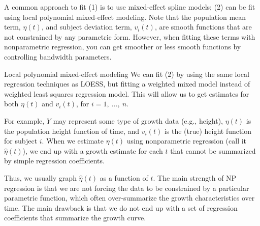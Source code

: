 \documentclass[
  9pt,
  ignorenonframetext,
]{beamer}
\begin{document}
\begin{frame}{}
\protect\hypertarget{section-6}{}
A common approach to fit (1) is to use mixed-effect spline models; (2)
can be fit using local polynomial mixed-effect modeling. Note that the
population mean term, \(\eta (t)\), and subject deviation term,
\(v_i(t)\), are smooth functions that are not constrained by any
parametric form. However, when fitting these terms with nonparametric
regression, you can get smoother or less smooth functions by controlling
bandwidth parameters.
\end{frame}

\begin{frame}{Local polynomial mixed-effect modeling}
\protect\hypertarget{local-polynomial-mixed-effect-modeling}{}
We can fit (2) by using the same local regression techniques as LOESS,
but fitting a weighted mixed model instead of weighted least squares
regression model. This will allow us to get estimates for both
\(\eta (t)\) and \(v_i(t)\), for \(i=1,\ ...,\ n\).

For example, \(Y\) may represent some type of growth data (e.g.,
height), \(\eta (t)\) is the population height function of time, and
\(v_i(t)\) is the (true) height function for subject \(i\). When we
estimate \(\eta (t)\) using nonparametric regression (call it
\(\hat \eta (t)\)), we end up with a growth estimate for each \(t\) that
cannot be summarized by simple regression coefficients.

Thus, we usually graph \(\hat \eta(t)\) as a function of \(t\). The main
strength of NP regression is that we are not forcing the data to be
constrained by a particular parametric function, which often
over-summarize the growth characteristics over time. The main drawback
is that we do not end up with a set of regression coefficients that
summarize the growth curve.
\end{frame}
\end{document}
